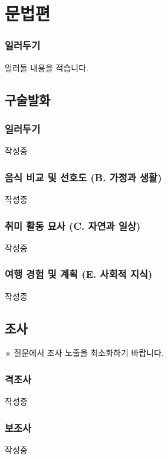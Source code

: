 \documentclass{snu-fl-questionnaire}
\begin{document}












\chapter{문법편}
\subsection{일러두기}
일러둘 내용을 적습니다.

\section{구술발화}
\subsection{일러두기}
작성중

\subsection{음식 비교 및 선호도 (B. 가정과 생활)}
작성중

\subsection{취미 활동 묘사 (C. 자연과 일상)}
작성중

\subsection{여행 경험 및 계획 (E. 사회적 지식)}
작성중

\section{조사}
※ 질문에서 조사 노출을 최소화하기 바랍니다.

\subsection{격조사}
작성중

\subsection{보조사}
작성중
\end{document}

